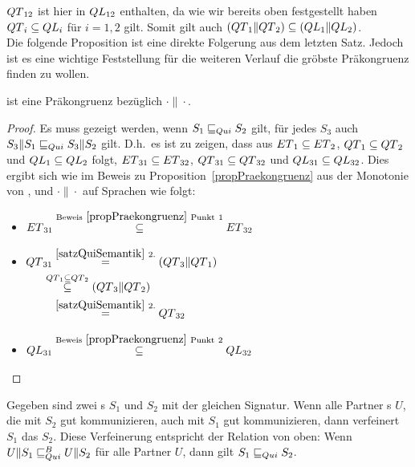 $QT{}_{12}$ ist hier in $QL{}_{12}$ enthalten, da wie wir bereits oben festgestellt
haben $QT{}_i\subseteq QL{}_i$ für $i=1,2$ gilt. Somit gilt auch
$(QT{}_1\|QT{}_2)\subseteq (QL{}_1\|QL{}_2)$.\\
Die folgende Proposition ist eine direkte Folgerung aus dem letzten Satz.
Jedoch ist es eine wichtige Feststellung für die weiteren Verlauf die gröbste
Präkongruenz finden zu wollen.

\begin{prop}[Präkongruenz]
  \label{propQuiPrae}
  \QRel{} ist eine Präkongruenz bezüglich $\cdot\|\cdot$.
\end{prop}

\begin{proof}
  Es muss gezeigt werden, wenn $S_1\sqsubseteq _{Qui} S_2$ gilt,  für   jedes $
  S_3$ auch $S_3\|S_1\sqsubseteq _{Qui} S_3\|S_2$ gilt. D.h.\ es ist zu zeigen,
  dass aus $ET{}_1\subseteq ET{}_2$, $QT{}_1\subseteq QT{}_2$ und
  $QL{}_1\subseteq QL{}_2$ folgt, $ET{}_{31}\subseteq ET{}_{32}$,
  $QT{}_{31}\subseteq QT{}_{32}$ und $QL{}_{31}\subseteq QL{}_{32}$. Dies
  ergibt sich wie im Beweis zu Proposition~\ref{propPraekongruenz} aus der
  Monotonie von \cont{}, \prune{} und $\cdot\|\cdot$ auf Sprachen wie folgt:
  \begin{itemize}
    \item $\begin{aligned}[t]
        ET{}_{31} \overset{\mathrm{Beweis}~\ref{propPraekongruenz}
        ~\mathrm{Punkt}~1}{\subseteq} ET{}_{32}
    \end{aligned}$
    \item $\begin{aligned}[t]
        \QT{}_{31} &\overset{\ref{satzQuiSemantik}~2.}{=} (\QT{}_3\|\QT{}_1)\\
                &\hspace{-0.3cm}\overset{\QT{}_1\subseteq \QT{}_2}{\subseteq} (\QT{}_3\|\QT{}_2)\\
                &\overset{\ref{satzQuiSemantik}~2.}{=} \QT{}_{32}
    \end{aligned}$
    \item $\begin{aligned}[t]
        QL{}_{31} \overset{\mathrm{Beweis}~\ref{propPraekongruenz}
        ~\mathrm{Punkt}~2}{\subseteq} QL{}_{32}
    \end{aligned}$
  \end{itemize}
\end{proof}

\begin{lem}
  \label{lemQuiVerfeinerung}
  Gegeben sind zwei \EIO{}s $S_1$ und $S_2$ mit der gleichen Signatur. Wenn
  alle Partner \EIO{}s $U$, die mit $S_2$  gut kommunizieren, auch mit $S_1$
  gut kommunizieren, dann verfeinert $S_1$ das \EIO{} $S_2$. Diese Verfeinerung
  entspricht der Relation \QRel{} von oben: Wenn $U\|S_1\sqsubseteq _{Qui}^B U\|S_2$ für alle
  Partner $U$, dann gilt $S_1\sqsubseteq _{Qui} S_2$.
\end{lem}

